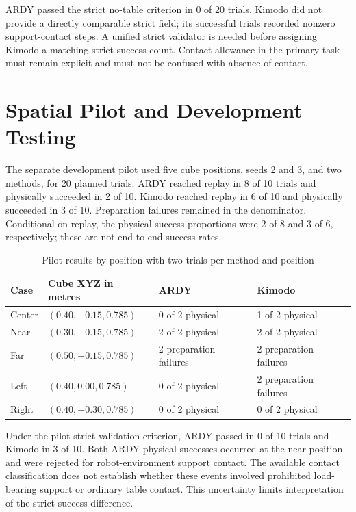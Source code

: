 \documentclass[11pt,a4paper]{article}
\begin{document}
ARDY passed the strict no-table criterion in 0 of 20 trials. Kimodo did not provide a directly comparable strict field; its successful trials recorded nonzero support-contact steps. A unified strict validator is needed before assigning Kimodo a matching strict-success count. Contact allowance in the primary task must remain explicit and must not be confused with absence of contact.

\section*{Spatial Pilot and Development Testing}

The separate development pilot used five cube positions, seeds 2 and 3, and two methods, for 20 planned trials. ARDY reached replay in 8 of 10 trials and physically succeeded in 2 of 10. Kimodo reached replay in 6 of 10 and physically succeeded in 3 of 10. Preparation failures remained in the denominator. Conditional on replay, the physical-success proportions were 2 of 8 and 3 of 6, respectively; these are not end-to-end success rates.

\begin{table}[H]
\centering
\caption{Pilot results by position with two trials per method and position}
\label{tab:comparison-5}
\small
\begin{tabularx}{\linewidth}{|L{\tabcolsep\relax}|C{\tabcolsep\relax}|Y|Y|}
\hline
{}
\textbf{Case} & \textbf{Cube XYZ in metres} & \textbf{ARDY} & \textbf{Kimodo} \\ \hline
Center & \((0.40, -0.15, 0.785)\) & 0 of 2 physical & 1 of 2 physical \\ \hline
Near & \((0.30, -0.15, 0.785)\) & 2 of 2 physical & 2 of 2 physical \\ \hline
Far & \((0.50, -0.15, 0.785)\) & 2 preparation failures & 2 preparation failures \\ \hline
Left & \((0.40, 0.00, 0.785)\) & 0 of 2 physical & 2 preparation failures \\ \hline
Right & \((0.40, -0.30, 0.785)\) & 0 of 2 physical & 0 of 2 physical \\ \hline
\end{tabularx}
\end{table}

Under the pilot strict-validation criterion, ARDY passed in 0 of 10 trials and Kimodo in 3 of 10. Both ARDY physical successes occurred at the near position and were rejected for robot-environment support contact. The available contact classification does not establish whether these events involved prohibited load-bearing support or ordinary table contact. This uncertainty limits interpretation of the strict-success difference.
\end{document}
